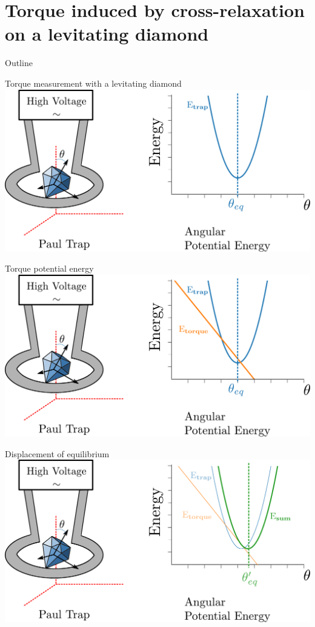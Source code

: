 \documentclass{beamer}
\begin{document}
\section{Torque induced by cross-relaxation on a levitating diamond}
\begin{frame}{Outline}
\tableofcontents[currentsection]
\end{frame}
\begin{frame}{Torque measurement with a levitating diamond}
\centering
\includegraphics[scale=.3]{Trap_0}%
\end{frame}
\begin{frame}{Torque potential energy}%
\centering
\includegraphics[scale=.3]{Trap_1}
\end{frame}
\begin{frame}{Displacement of equilibrium}
\centering
\includegraphics[scale=.3]{Trap_2}
\end{frame}
\end{document}
